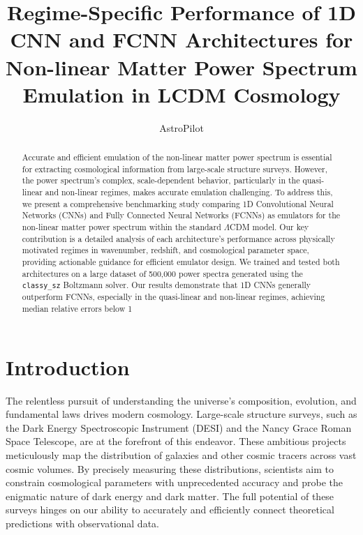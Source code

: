 \documentclass[twocolumn]{aastex631}
\begin{document}
\title{Regime-Specific Performance of 1D CNN and FCNN Architectures for Non-linear Matter Power Spectrum Emulation in LCDM Cosmology}

\author{AstroPilot}

\begin{abstract}
Accurate and efficient emulation of the non-linear matter power spectrum is essential for extracting cosmological information from large-scale structure surveys. However, the power spectrum's complex, scale-dependent behavior, particularly in the quasi-linear and non-linear regimes, makes accurate emulation challenging. To address this, we present a comprehensive benchmarking study comparing 1D Convolutional Neural Networks (CNNs) and Fully Connected Neural Networks (FCNNs) as emulators for the non-linear matter power spectrum within the standard \(\Lambda\)CDM model. Our key contribution is a detailed analysis of each architecture's performance across physically motivated regimes in wavenumber, redshift, and cosmological parameter space, providing actionable guidance for efficient emulator design. We trained and tested both architectures on a large dataset of 500,000 power spectra generated using the \texttt{classy\_sz} Boltzmann solver. Our results demonstrate that 1D CNNs generally outperform FCNNs, especially in the quasi-linear and non-linear regimes, achieving median relative errors below 1%
\end{abstract}



\section{Introduction}
\label{sec:intro}





\noindent The relentless pursuit of understanding the universe's composition, evolution, and fundamental laws drives modern cosmology. Large-scale structure surveys, such as the Dark Energy Spectroscopic Instrument (DESI) and the Nancy Grace Roman Space Telescope, are at the forefront of this endeavor. These ambitious projects meticulously map the distribution of galaxies and other cosmic tracers across vast cosmic volumes. By precisely measuring these distributions, scientists aim to constrain cosmological parameters with unprecedented accuracy and probe the enigmatic nature of dark energy and dark matter. The full potential of these surveys hinges on our ability to accurately and efficiently connect theoretical predictions with observational data.
\end{document}
